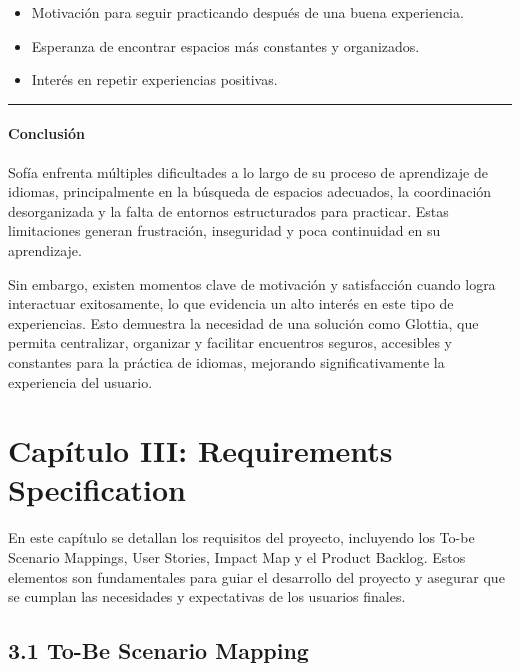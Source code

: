 \begin{itemize}
\tightlist
\item
  Motivación para seguir practicando después de una buena experiencia.
\item
  Esperanza de encontrar espacios más constantes y organizados.
\item
  Interés en repetir experiencias positivas.
\end{itemize}

\begin{center}\rule{0.5\linewidth}{0.5pt}\end{center}

\paragraph{Conclusión}\label{report__20-cap2-requirements-analysis.md__conclusiuxf3n}

Sofía enfrenta múltiples dificultades a lo largo de su proceso de
aprendizaje de idiomas, principalmente en la búsqueda de espacios
adecuados, la coordinación desorganizada y la falta de entornos
estructurados para practicar. Estas limitaciones generan frustración,
inseguridad y poca continuidad en su aprendizaje.

Sin embargo, existen momentos clave de motivación y satisfacción cuando
logra interactuar exitosamente, lo que evidencia un alto interés en este
tipo de experiencias. Esto demuestra la necesidad de una solución como
Glottia, que permita centralizar, organizar y facilitar encuentros
seguros, accesibles y constantes para la práctica de idiomas, mejorando
significativamente la experiencia del usuario.

\section{Capítulo III: Requirements
Specification}\label{report__30-cap3-requirements-spec.md__capuxedtulo-iii-requirements-specification}

En este capítulo se detallan los requisitos del proyecto, incluyendo los
To-be Scenario Mappings, User Stories, Impact Map y el Product Backlog.
Estos elementos son fundamentales para guiar el desarrollo del proyecto
y asegurar que se cumplan las necesidades y expectativas de los usuarios
finales.

\subsection{3.1 To-Be Scenario
Mapping}\label{report__30-cap3-requirements-spec.md__to-be-scenario-mapping}

